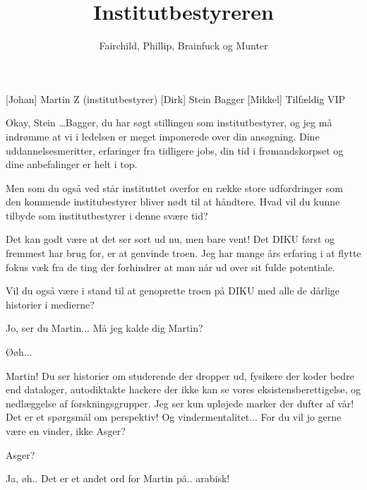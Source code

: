 \documentclass[a4paper,11pt]{article}
\title{Institutbestyreren}
\author{Fairchild, Phillip, Brainfuck og Munter}
\begin{document}
\maketitle

\begin{roles}
[Johan] Martin Z (institutbestyrer)
[Dirk] Stein Bagger
[Mikkel] Tilfældig VIP
\end{roles}

\begin{props}
\end{props}


\begin{sketch}


   Okay, Stein \dots Bagger, du har søgt stillingen som
  institutbestyrer, og jeg må indrømme at vi i ledelsen er meget
  imponerede over din ansøgning. Dine uddannelsesmeritter, erfaringer
  fra tidligere jobs, din tid i frømandskorpset og dine anbefalinger
  er helt i top. 

  Men som du også ved står instituttet overfor en række store
  udfordringer som den kommende institubestyrer bliver nødt til at
  håndtere. Hvad vil du kunne tilbyde som institutbestyrer i denne
  svære tid?

   Det kan godt være at det ser sort ud nu, men bare vent!
  Det DIKU først og fremmest har brug for, er at genvinde troen. Jeg
  har mange års erfaring i at flytte fokus væk fra de ting der
  forhindrer at man når ud over sit fulde potentiale.

   Vil du også være i stand til at genoprette troen på DIKU
  med alle de dårlige historier i medierne?

 Jo, ser du Martin... Må jeg kalde dig Martin?

 Øøh...

 Martin! Du ser historier om studerende der dropper ud,
fysikere der koder bedre end dataloger, autodiktakte hackere der ikke
kan se vores eksistensberettigelse, og nedlæggelse af
forskningsgrupper. Jeg ser kun upløjede marker der dufter af vår! Det
er et spørgsmål om perspektiv! Og vindermentalitet... For du vil jo
gerne være en vinder, ikke Asger?

 Asger?

 Ja, øh.. Det er et andet ord for Martin på.. arabisk!


\end{sketch}
\end{document}
